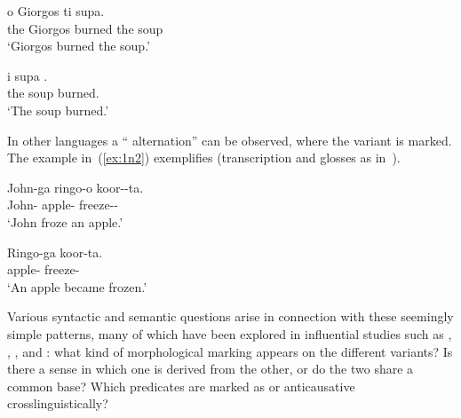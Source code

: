 \begin{exe}
\begin{xlist}
\begin{exe}
\begin{exe}
\begin{exe}
\begin{exe}
\begin{xlist}
\begin{exe}
\begin{xlist}
\begin{xlist}
 \z

 \ex {} \label{ex:intro3} 
 \begin{xlist} 
 	\ex   
 		\gll o Giorgos  ti supa.\\
		 the Giorgos burned the soup\\ 
 		\glt `Giorgos burned the soup.' 
	
 	\ex   
 		\gll i supa .\\
		 the soup burned.\\ 
 		\glt `The soup burned.' 
	
 \z
\z 

In other languages a `` alternation'' can be observed, where the  variant is marked. The  example in~(\ref{ex:1n2}) exemplifies (transcription and glosses as in~\citealt[3]{oseki17nyu}).

 \begin{exe}
 \ex  {} \label{ex:1n2}
 \begin{xlist} 
 	\ex   
 		\gll John-ga ringo-o koor--ta.\\
		 John- apple- freeze--\\ 
 		\glt `John froze an apple.' 
	
 	\ex   
 		\gll Ringo-ga koor-ta.\\
		 apple- freeze-\\ 
 		\glt `An apple became frozen.' 
	
 \z
\z 

Various syntactic and semantic questions arise in connection with these seemingly simple patterns, many of which have been explored in influential studies such as \cite{haspelmath93}, \cite{unaccusativity95}, \cite{schaefer08}, \cite{koontzgarboden09} and \cite{layering15}: what kind of morphological marking appears on the different variants? Is there a sense in which one is derived from the other, or do the two share a common base? Which predicates are marked as  or anticausative crosslinguistically? 


\end{xlist}
\end{exe}
\end{xlist}
\end{xlist}
\end{xlist}
\end{exe}
\end{xlist}
\end{exe}
\end{exe}
\end{exe}
\end{exe}
\end{xlist}
\end{exe}
